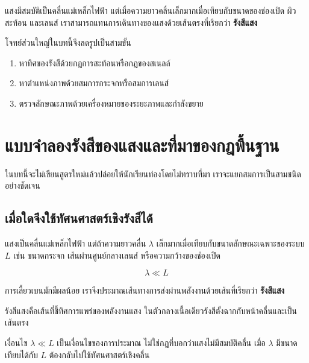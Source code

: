 \begin{tcolorbox}[title={แนวคิดสำคัญของบทนี้}]
แสงมีสมบัติเป็นคลื่นแม่เหล็กไฟฟ้า แต่เมื่อความยาวคลื่นเล็กมากเมื่อเทียบกับขนาดของช่องเปิด ผิวสะท้อน และเลนส์ เราสามารถแทนการเดินทางของแสงด้วยเส้นตรงที่เรียกว่า \textbf{รังสีแสง}

โจทย์ส่วนใหญ่ในบทนี้จึงลดรูปเป็นสามขั้น

\begin{enumerate}
    \item หาทิศของรังสีด้วยกฎการสะท้อนหรือกฎของสเนลล์
    \item หาตำแหน่งภาพด้วยสมการกระจกหรือสมการเลนส์
    \item ตรวจลักษณะภาพด้วยเครื่องหมายของระยะภาพและกำลังขยาย
\end{enumerate}
\end{tcolorbox}

\section{แบบจำลองรังสีของแสงและที่มาของกฎพื้นฐาน}

\begin{tcolorbox}[title={ก่อนเริ่ม: สมการในบทนี้มีสามชนิด}]
ในบทนี้จะไม่เขียนสูตรใหม่แล้วปล่อยให้นักเรียนท่องโดยไม่ทราบที่มา เราจะแยกสมการเป็นสามชนิดอย่างชัดเจน


\end{tcolorbox}

\subsection{เมื่อใดจึงใช้ทัศนศาสตร์เชิงรังสีได้}

แสงเป็นคลื่นแม่เหล็กไฟฟ้า แต่ถ้าความยาวคลื่น $\lambda$ เล็กมากเมื่อเทียบกับขนาดลักษณะเฉพาะของระบบ $L$ เช่น ขนาดกระจก เส้นผ่านศูนย์กลางเลนส์ หรือความกว้างของช่องเปิด

\[
\lambda\ll L
\]

การเลี้ยวเบนมักมีผลน้อย เราจึงประมาณเส้นทางการส่งผ่านพลังงานด้วยเส้นที่เรียกว่า \textbf{รังสีแสง}

\begin{tcolorbox}[title={แบบจำลองรังสี}]
รังสีแสงคือเส้นที่ชี้ทิศการแพร่ของพลังงานแสง ในตัวกลางเนื้อเดียวรังสีตั้งฉากกับหน้าคลื่นและเป็นเส้นตรง
\end{tcolorbox}

เงื่อนไข $\lambda\ll L$ เป็นเงื่อนไขของการประมาณ ไม่ใช่กฎที่บอกว่าแสงไม่มีสมบัติคลื่น เมื่อ $\lambda$ มีขนาดเทียบได้กับ $L$ ต้องกลับไปใช้ทัศนศาสตร์เชิงคลื่น

